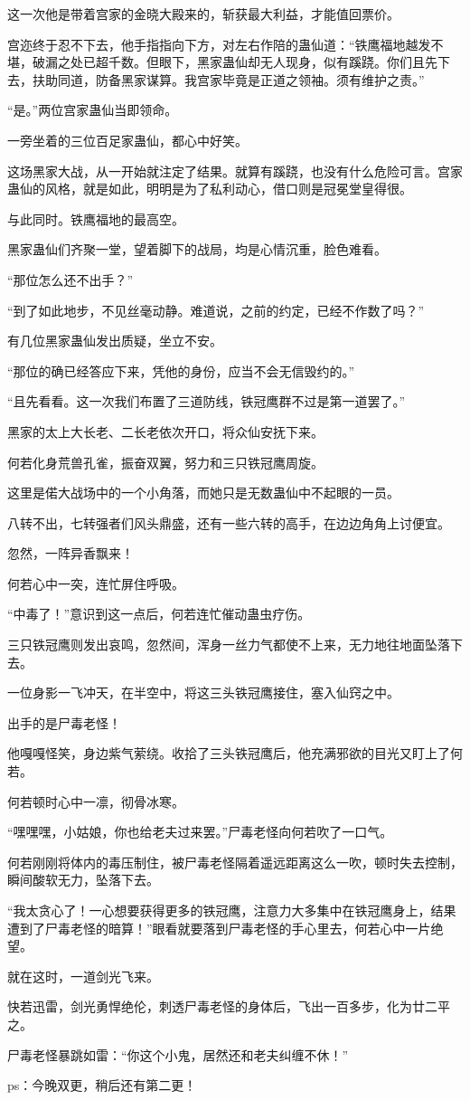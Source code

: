 \begin{this_body}
这一次他是带着宫家的金晓大殿来的，斩获最大利益，才能值回票价。

宫迩终于忍不下去，他手指指向下方，对左右作陪的蛊仙道：“铁鹰福地越发不堪，破漏之处已超千数。但眼下，黑家蛊仙却无人现身，似有蹊跷。你们且先下去，扶助同道，防备黑家谋算。我宫家毕竟是正道之领袖。须有维护之责。”

“是。”两位宫家蛊仙当即领命。

一旁坐着的三位百足家蛊仙，都心中好笑。

这场黑家大战，从一开始就注定了结果。就算有蹊跷，也没有什么危险可言。宫家蛊仙的风格，就是如此，明明是为了私利动心，借口则是冠冕堂皇得很。

与此同时。铁鹰福地的最高空。

黑家蛊仙们齐聚一堂，望着脚下的战局，均是心情沉重，脸色难看。

“那位怎么还不出手？”

“到了如此地步，不见丝毫动静。难道说，之前的约定，已经不作数了吗？”

有几位黑家蛊仙发出质疑，坐立不安。

“那位的确已经答应下来，凭他的身份，应当不会无信毁约的。”

“且先看看。这一次我们布置了三道防线，铁冠鹰群不过是第一道罢了。”

黑家的太上大长老、二长老依次开口，将众仙安抚下来。

何若化身荒兽孔雀，振奋双翼，努力和三只铁冠鹰周旋。

这里是偌大战场中的一个小角落，而她只是无数蛊仙中不起眼的一员。

八转不出，七转强者们风头鼎盛，还有一些六转的高手，在边边角角上讨便宜。

忽然，一阵异香飘来！

何若心中一突，连忙屏住呼吸。

“中毒了！”意识到这一点后，何若连忙催动蛊虫疗伤。

三只铁冠鹰则发出哀鸣，忽然间，浑身一丝力气都使不上来，无力地往地面坠落下去。

一位身影一飞冲天，在半空中，将这三头铁冠鹰接住，塞入仙窍之中。

出手的是尸毒老怪！

他嘎嘎怪笑，身边紫气萦绕。收拾了三头铁冠鹰后，他充满邪欲的目光又盯上了何若。

何若顿时心中一凛，彻骨冰寒。

“嘿嘿嘿，小姑娘，你也给老夫过来罢。”尸毒老怪向何若吹了一口气。

何若刚刚将体内的毒压制住，被尸毒老怪隔着遥远距离这么一吹，顿时失去控制，瞬间酸软无力，坠落下去。

“我太贪心了！一心想要获得更多的铁冠鹰，注意力大多集中在铁冠鹰身上，结果遭到了尸毒老怪的暗算！”眼看就要落到尸毒老怪的手心里去，何若心中一片绝望。

就在这时，一道剑光飞来。

快若迅雷，剑光勇悍绝伦，刺透尸毒老怪的身体后，飞出一百多步，化为廿二平之。

尸毒老怪暴跳如雷：“你这个小鬼，居然还和老夫纠缠不休！”

ps：今晚双更，稍后还有第二更！

\end{this_body}

